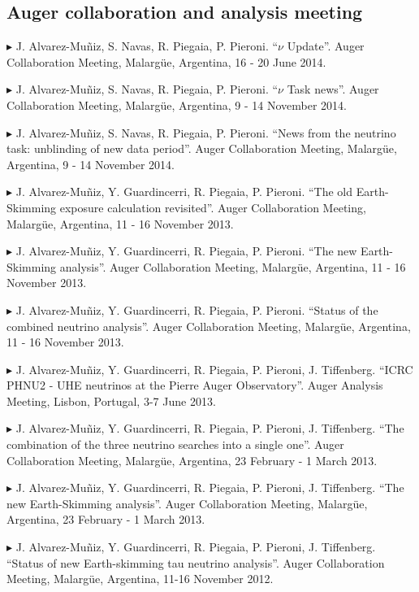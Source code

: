 \documentclass[letterpaper]{article}
\renewenvironment{itemize}{
  \begin{list}{}{
    \setlength{\leftmargin}{1.5em}
  }
}{
  \end{list}
}
\begin{document}
\subsection*{Auger collaboration and analysis meeting}       
\begin{itemize}\itemsep -1pt
  \item{$\blacktriangleright$} J. Alvarez-Muñiz, S. Navas, R. Piegaia, P. Pieroni. ``$\nu$ Update''. Auger Collaboration Meeting, Malargüe, Argentina, 16 - 20 June 2014.
  \item{$\blacktriangleright$} J. Alvarez-Muñiz, S. Navas, R. Piegaia, P. Pieroni. ``$\nu$ Task news''. Auger Collaboration Meeting, Malargüe, Argentina, 9 - 14 November 2014.
  \item{$\blacktriangleright$} J. Alvarez-Muñiz, S. Navas, R. Piegaia, P. Pieroni. ``News from the neutrino task: unblinding of new data period''. Auger Collaboration Meeting, Malargüe, Argentina, 9 - 14 November 2014.
  \item{$\blacktriangleright$} J. Alvarez-Muñiz, Y. Guardincerri, R. Piegaia, P. Pieroni. ``The old Earth-Skimming exposure calculation revisited''. Auger Collaboration Meeting, Malargüe, Argentina, 11 - 16 November 2013.
  \item{$\blacktriangleright$} J. Alvarez-Muñiz, Y. Guardincerri, R. Piegaia, P. Pieroni. ``The new Earth-Skimming analysis''. Auger Collaboration Meeting, Malargüe, Argentina, 11 - 16 November 2013.
  \item{$\blacktriangleright$} J. Alvarez-Muñiz, Y. Guardincerri, R. Piegaia, P. Pieroni. ``Status of the combined neutrino analysis''. Auger Collaboration Meeting, Malargüe, Argentina, 11 - 16 November 2013.
  \item{$\blacktriangleright$} J. Alvarez-Muñiz, Y. Guardincerri, R. Piegaia, P. Pieroni, J. Tiffenberg. ``ICRC PHNU2 - UHE neutrinos at the Pierre Auger Observatory''. Auger Analysis Meeting, Lisbon, Portugal, 3-7 June 2013.
  \item{$\blacktriangleright$} J. Alvarez-Muñiz, Y. Guardincerri, R. Piegaia, P. Pieroni, J. Tiffenberg. ``The combination of the three neutrino searches into a single one''. Auger Collaboration Meeting, Malargüe, Argentina, 23 February - 1 March 2013.
  \item{$\blacktriangleright$} J. Alvarez-Muñiz, Y. Guardincerri, R. Piegaia, P. Pieroni, J. Tiffenberg. ``The new Earth-Skimming analysis''. Auger Collaboration Meeting, Malargüe, Argentina, 23 February - 1 March 2013.
  \item{$\blacktriangleright$} J. Alvarez-Muñiz, Y. Guardincerri, R. Piegaia, P. Pieroni, J. Tiffenberg. ``Status of new Earth-skimming tau neutrino analysis''. Auger Collaboration Meeting, Malargüe, Argentina, 11-16 November 2012.

\end{itemize}
\end{document}
